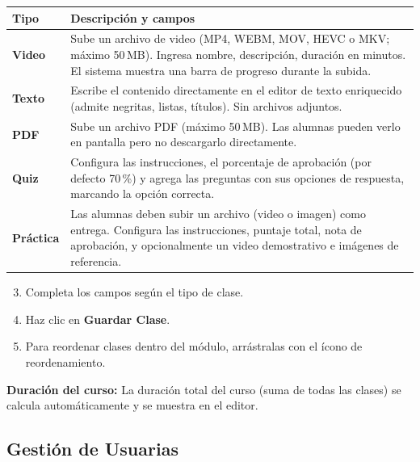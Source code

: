 \documentclass[a4paper,11pt]{article}
\begin{document}
\renewcommand{\arraystretch}{1.3}
\begin{longtable}{L{2.8cm} L{11.7cm}}
\toprule
\textbf{Tipo} & \textbf{Descripci\'on y campos} \\
\midrule
\endhead
\bottomrule
\endfoot

\textbf{Video} &
  Sube un archivo de video (MP4, WEBM, MOV, HEVC o MKV; m\'aximo 50\,MB).
  Ingresa nombre, descripci\'on, duraci\'on en minutos.
  El sistema muestra una barra de progreso durante la subida. \\

\textbf{Texto} &
  Escribe el contenido directamente en el editor de texto enriquecido
  (admite negritas, listas, t\'itulos). Sin archivos adjuntos. \\

\textbf{PDF} &
  Sube un archivo PDF (m\'aximo 50\,MB). Las alumnas pueden verlo
  en pantalla pero no descargarlo directamente. \\

\textbf{Quiz} &
  Configura las instrucciones, el porcentaje de aprobaci\'on
  (por defecto 70\,\%) y agrega las preguntas con sus opciones
  de respuesta, marcando la opci\'on correcta. \\

\textbf{Pr\'actica} &
  Las alumnas deben subir un archivo (video o imagen) como entrega.
  Configura las instrucciones, puntaje total, nota de aprobaci\'on,
  y opcionalmente un video demostrativo e im\'agenes de referencia. \\

\end{longtable}

\begin{enumerate}
  \setcounter{enumi}{2}
  \item Completa los campos seg\'un el tipo de clase.
  \item Haz clic en \textbf{Guardar Clase}.
  \item Para reordenar clases dentro del m\'odulo, arr\'astralas con el \'icono
        de reordenamiento.
\end{enumerate}

\begin{infobox}
\textbf{Duraci\'on del curso:} La duraci\'on total del curso (suma de todas las
clases) se calcula autom\'aticamente y se muestra en el editor.
\end{infobox}

\subsection{Gesti\'on de Usuarias}
\end{document}
